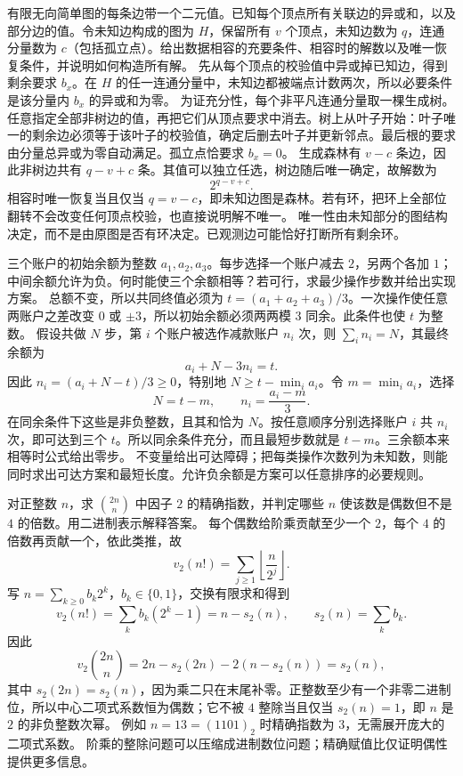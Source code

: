 有限无向简单图的每条边带一个二元值。已知每个顶点所有关联边的异或和，以及部分边的值。令未知边构成的图为 $H$，保留所有 $v$ 个顶点，未知边数为 $q$，连通分量数为 $c$（包括孤立点）。给出数据相容的充要条件、相容时的解数以及唯一恢复条件，并说明如何构造所有解。
\solution 先从每个顶点的校验值中异或掉已知边，得到剩余要求 $b_x$。在 $H$ 的任一连通分量中，未知边都被端点计数两次，所以必要条件是该分量内 $b_x$ 的异或和为零。
为证充分性，每个非平凡连通分量取一棵生成树。任意指定全部非树边的值，再把它们从顶点要求中消去。树上从叶子开始：叶子唯一的剩余边必须等于该叶子的校验值，确定后删去叶子并更新邻点。最后根的要求由分量总异或为零自动满足。孤立点恰要求 $b_x=0$。
生成森林有 $v-c$ 条边，因此非树边共有 $q-v+c$ 条。其值可以独立任选，树边随后唯一确定，故解数为
\[
 \boxed{2^{q-v+c}}.
\]
相容时唯一恢复当且仅当 $q=v-c$，即未知边图是森林。若有环，把环上全部位翻转不会改变任何顶点校验，也直接说明解不唯一。
\insight 唯一性由未知部分的图结构决定，而不是由原图是否有环决定。已观测边可能恰好打断所有剩余环。

三个账户的初始余额为整数 $a_1,a_2,a_3$。每步选择一个账户减去 $2$，另两个各加 $1$；中间余额允许为负。何时能使三个余额相等？若可行，求最少操作步数并给出实现方案。
\solution 总额不变，所以共同终值必须为 $t=(a_1+a_2+a_3)/3$。一次操作使任意两账户之差改变 $0$ 或 $\pm3$，所以初始余额必须两两模 $3$ 同余。此条件也使 $t$ 为整数。
假设共做 $N$ 步，第 $i$ 个账户被选作减款账户 $n_i$ 次，则 $\sum_i n_i=N$，其最终余额为
\[
 a_i+N-3n_i=t.
\]
因此 $n_i=(a_i+N-t)/3\ge0$，特别地 $N\ge t-\min_i a_i$。令 $m=\min_i a_i$，选择
\[
 N=t-m,\qquad n_i=\frac{a_i-m}{3}.
\]
在同余条件下这些是非负整数，且其和恰为 $N$。按任意顺序分别选择账户 $i$ 共 $n_i$ 次，即可达到三个 $t$。所以同余条件充分，而且最短步数就是 $t-m$。三余额本来相等时公式给出零步。
\insight 不变量给出可达障碍；把每类操作次数列为未知数，则能同时求出可达方案和最短长度。允许负余额是方案可以任意排序的必要规则。

对正整数 $n$，求 $\binom{2n}{n}$ 中因子 $2$ 的精确指数，并判定哪些 $n$ 使该数是偶数但不是 $4$ 的倍数。用二进制表示解释答案。
\solution 每个偶数给阶乘贡献至少一个 $2$，每个 $4$ 的倍数再贡献一个，依此类推，故
\[
 v_2(n!)=\sum_{j\ge1}\left\lfloor\frac n{2^j}\right\rfloor.
\]
写 $n=\sum_{k\ge0}b_k2^k$，$b_k\in\{0,1\}$，交换有限求和得到
\[
 v_2(n!)=\sum_k b_k(2^k-1)=n-s_2(n),
 \qquad s_2(n)=\sum_k b_k.
\]
因此
\[
 v_2\binom{2n}{n}
 =2n-s_2(2n)-2(n-s_2(n))=s_2(n),
\]
其中 $s_2(2n)=s_2(n)$，因为乘二只在末尾补零。正整数至少有一个非零二进制位，所以中心二项式系数恒为偶数；它不被 $4$ 整除当且仅当 $s_2(n)=1$，即 $n$ 是 $2$ 的非负整数次幂。
例如 $n=13=(1101)_2$ 时精确指数为 $3$，无需展开庞大的二项式系数。
\insight 阶乘的整除问题可以压缩成进制数位问题；精确赋值比仅证明偶性提供更多信息。

